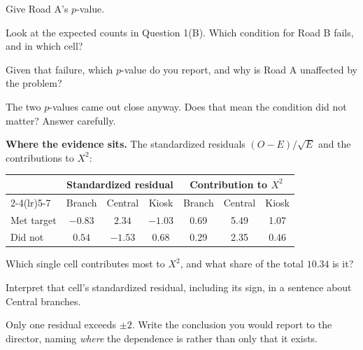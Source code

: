 \documentclass[11pt]{article}
\newcommand{\answerspace}[1]{\vspace{#1}}
\begin{document}
\begin{questions}
\begin{parts}
\item Give Road A's $p$-value.
\answerspace{2.5em}

\item Look at the expected counts in Question 1(B). Which condition for Road B fails, and in which
cell?
\answerspace{3.5em}

\item Given that failure, which $p$-value do you report, and why is Road A unaffected by the
problem?
\answerspace{4em}

\item The two $p$-values came out close anyway. Does that mean the condition did not matter?
Answer carefully.
\answerspace{4em}
\end{parts}

\item \textbf{Where the evidence sits.} The standardized residuals $(O-E)/\sqrt{E}$ and the
contributions to $X^2$:

\begin{center}
\renewcommand{\arraystretch}{1.2}
\begin{tabular}{lcccccc}
\toprule
 & \multicolumn{3}{c}{\textbf{Standardized residual}} & \multicolumn{3}{c}{\textbf{Contribution to $X^2$}} \\
\cmidrule(lr){2-4}\cmidrule(lr){5-7}
 & Branch & Central & Kiosk & Branch & Central & Kiosk \\
\midrule
Met target & $-0.83$ & $2.34$ & $-1.03$ & 0.69 & 5.49 & 1.07 \\
Did not & $0.54$ & $-1.53$ & $0.68$ & 0.29 & 2.35 & 0.46 \\
\bottomrule
\end{tabular}
\end{center}

\begin{parts}
\item Which single cell contributes most to $X^2$, and what share of the total $10.34$ is it?
\answerspace{3em}

\item Interpret that cell's standardized residual, including its sign, in a sentence about
Central branches.
\answerspace{3.5em}

\item Only one residual exceeds $\pm 2$. Write the conclusion you would report to the director,
naming \emph{where} the dependence is rather than only that it exists.
\answerspace{4em}


\end{parts}
\end{questions}
\end{document}

